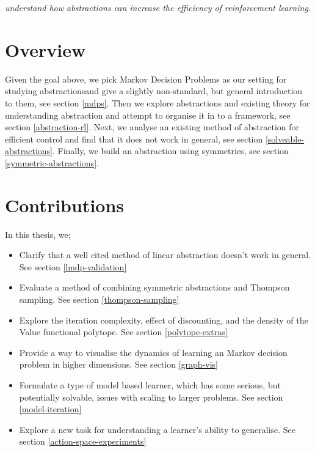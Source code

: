 \begin{displayquote}
\textit{understand how abstractions can increase the efficiency of reinforcement learning.}
\end{displayquote}

\section{Overview}

Given the goal above, we pick Markov Decision Problems as our setting for studying abstractions\footnotemark and give a slightly non-standard, but general introduction to them, see section \ref{mdps}.
Then we explore abstractions and existing theory for understanding abstraction and attempt to organise it in to a framework, see section \ref{abstraction-rl}.
Next, we analyse an existing method of abstraction for efficient control and find that it does not work in general, see section \ref{solveable-abstractions}.
Finally, we build an abstraction using symmetries, see section \ref{symmetric-abstractions}.


\section{Contributions}

In this thesis, we;

\begin{itemize}
  \tightlist
  \item Clarify that a well cited method of linear abstraction doesn't work in general. See section \ref{lmdp-validation}
  \item Evaluate a method of combining symmetric abstractions and Thompson sampling. See section \ref{thompson-sampling}
  \item Explore the iteration complexity, effect of discounting, and the density of the Value functional polytope. See section \ref{polytope-extras}
  \item Provide a way to visualise the dynamics of learning an Markov decision problem in higher dimensions. See section \ref{graph-vis}
  \item Formulate a type of model based learner, which has some serious, but potentially solvable, issues with scaling to larger problems. See section \ref{model-iteration}
  \item Explore a new task for understanding a learner's ability to generalise. See section \ref{action-space-experiments}
\end{itemize}
